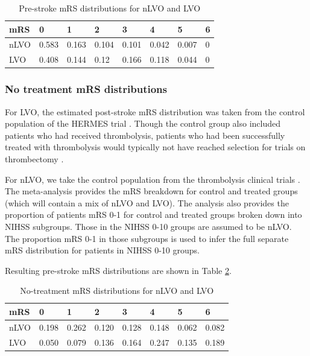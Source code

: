 \begin{table}
\caption{Pre-stroke mRS distributions for nLVO and LVO}\label{tab:pre_stroke}
\centering
\begin{tabular}{l | l l l l l l l}
mRS & 0 & 1 & 2 & 3 & 4 & 5 & 6 \\
\hline
nLVO & 0.583 & 0.163 & 0.104 & 0.101 & 0.042 & 0.007 & 0 \\
LVO & 0.408 & 0.144 & 0.12 & 0.166 & 0.118 & 0.044 & 0 \\
\end{tabular}
\end{table}

\subsubsection{No treatment mRS distributions}

For LVO, the estimated post-stroke mRS distribution was taken from the control population of the HERMES trial \cite{goyal_endovascular_2016}. Though the control group also included patients who had received thrombolysis, patients who had been successfully treated with thrombolysis would typically not have reached selection for trials on thrombectomy \cite{tsivgoulis_successful_2018}.


For nLVO, we take the control population from the thrombolysis clinical trials \cite{emberson_effect_2014}. The meta-analysis provides the mRS breakdown for control and treated groups (which will contain a mix of nLVO and LVO). The analysis also provides the proportion of patients mRS 0-1 for control and treated groups broken down into NIHSS subgroups. Those in the NIHSS 0-10 groups are assumed to be nLVO. The proportion mRS 0-1 in those subgroups is used to infer the full separate mRS distribution for patients in NIHSS 0-10 groups. 

Resulting pre-stroke mRS distributions are shown in Table \ref{tab:no_treatment}. 

\begin{table}
\caption{No-treatment mRS distributions for nLVO and LVO}\label{tab:no_treatment}
\centering
\begin{tabular}{l | l l l l l l l}
mRS & 0 & 1 & 2 & 3 & 4 & 5 & 6 \\
\hline
nLVO & 0.198 & 0.262 & 0.120 & 0.128 & 0.148 & 0.062 & 0.082 \\
LVO & 0.050 & 0.079 & 0.136 & 0.164 & 0.247 & 0.135 & 0.189 \\
\end{tabular}
\end{table}

